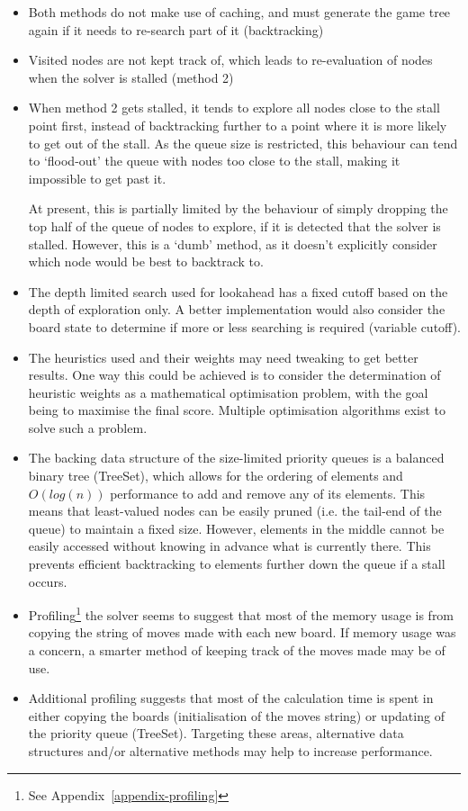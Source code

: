 \documentclass[a4paper, 11pt, titlepage]{report}
\begin{document}
\begin{itemize}
	\item Both methods do not make use of caching, and must generate the game tree again if it needs to re-search part of it (backtracking)
	\item Visited nodes are not kept track of, which leads to re-evaluation of nodes when the solver is stalled (method 2)
	\item When method 2 gets stalled, it tends to explore all nodes close to the stall point first, instead of backtracking further to a point where it is more likely to get out of the stall. As the queue size is restricted, this behaviour can tend to `flood-out' the queue with nodes too close to the stall, making it impossible to get past it. 
	
	At present, this is partially limited by the behaviour of simply dropping the top half of the queue of nodes to explore, if it is detected that the solver is stalled. However, this is a `dumb' method, as it doesn't explicitly consider which node would be best to backtrack to.
	\item The depth limited search used for lookahead has a fixed cutoff based on the depth of exploration only. A better implementation would also consider the board state to determine if more or less searching is required (variable cutoff).
	\item The heuristics used and their weights may need tweaking to get better results. One way this could be achieved is to consider the determination of heuristic weights as a mathematical optimisation problem, with the goal being to maximise the final score. Multiple optimisation algorithms exist to solve such a problem\cite{scipy-optimisation}.
	\item The backing data structure of the size-limited priority queues is a balanced binary tree (TreeSet), which allows for the ordering of elements and $O(log(n))$ performance to add and remove any of its elements. This means that least-valued nodes can be easily pruned (i.e. the tail-end of the queue) to maintain a fixed size. However, elements in the middle cannot be easily accessed without knowing in advance what is currently there. This prevents efficient backtracking to elements further down the queue if a stall occurs.
	\item Profiling\footnote{See Appendix~\ref{appendix-profiling}} the solver seems to suggest that most of the memory usage is from copying the string of moves made with each new board. If memory usage was a concern, a smarter method of keeping track of the moves made may be of use.
	\item Additional profiling suggests that most of the calculation time is spent in either copying the boards (initialisation of the moves string) or updating of the priority queue (TreeSet). Targeting these areas, alternative data structures and/or alternative methods may help to increase performance.
\end{itemize}
\end{document}
